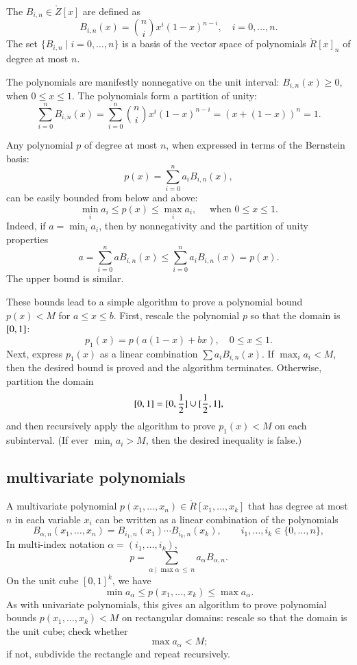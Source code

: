 The  $B_{i,n}\in\ring{Z}[x]$ are defined as
\begin{equation}
B_{i,n}(x) = {n\choose i} x^i (1-x)^{n-i},\quad i=0,\ldots,n.
\end{equation}
The set $\{B_{i,n}\mid i=0,\ldots,n\}$ is a basis of the vector space
of polynomials $\ring{R}[x]_n$ of degree at most $n$.

The polynomials are manifestly nonnegative on the unit interval:
$B_{i,n}(x)\ge 0$, when $0\le x\le 1$.  The polynomials form a
partition of unity:
\[
\sum_{i=0}^n B_{i,n}(x) = \sum_{i=0}^n {n\choose i} x^i (1-x)^{n-i} = 
(x + (1-x))^n = 1.
\]

Any polynomial $p$ of degree at most $n$, 
when expressed in terms of the Bernstein basis:
\[
p(x) =  \sum_{i=0}^n a_i B_{i,n}(x),
\]
can be easily bounded from below and above:
\[
\min_i a_i \le p(x) \le \max_i a_i,\quad\text{ when } 0 \le x \le 1.
\]
Indeed, if $a = \min_i a_i$, then by nonnegativity and the partition
of unity properties
\[
a  =  \sum_{i=0}^n a B_{i,n}(x) \le \sum_{i=0}^n a_i B_{i,n}(x) = p(x).
\]
The upper bound is similar.

These bounds lead to a simple algorithm to prove a polynomial bound
$p(x) < M$ for $a\le x\le b$.  First, rescale the polynomial $p$ so
that the domain is $[ 0,1]$:
\[
p_1(x) = p(a (1-x) + b x), \quad 0\le x \le 1.
\]
Next, express $p_1(x)$ as a linear combination $\sum a_i B_{i,n}(x)$.
If $\max_i a_i < M$, then the desired bound is proved and the algorithm
terminates.  Otherwise,
 partition the domain
\[
[ 0,1] = [  0,\frac{1}{2}]
\cup [  \frac{1}{2},1],
\]
and then recursively apply the algorithm to prove $p_1(x)<M$ on each
subinterval.   (If ever $\min_i a_i > M$, then the desired inequality is false.)


\subsection{multivariate polynomials}

A multivariate polynomial $p(x_1,\ldots,x_n)\in \ring{R}[x_1,\ldots,x_k]$ that
has degree at most $n$ in each variable $x_i$ can be written as a linear
combination of the polynomials
\[
B_{\alpha,n}(x_1,\ldots,x_n)=B_{i_1,n}(x_1)\cdots B_{i_k,n}(x_k),\qquad
 i_1,\ldots,i_k\in \{0,\ldots,n\},
\]
In multi-index notation $\alpha=(i_1,\ldots,i_k)$, 
\[
p = \sum_{\alpha\mid \max{\alpha}\,\le\, n} a_\alpha B_{\alpha,n}.
\]
On the unit cube $[0,1]^k$, we have
\[
\min a_\alpha \le p(x_1,\ldots,x_k) \le \max a_\alpha.
\]
As with univariate polynomials, this gives an algorithm to prove
polynomial bounds $p(x_1,\ldots,x_k)<M$ on rectangular domains:
rescale so that the domain is the unit cube; check whether
\[
\max a_\alpha < M;
\]
if not, subdivide the rectangle and repeat recursively.



